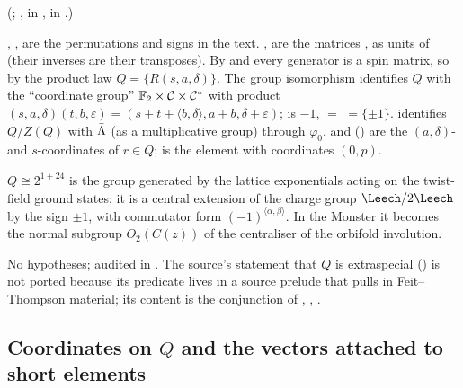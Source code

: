 (;
,  in ,  in .)
\begin{dictionary}
, ,  are the permutations and signs in the text.
,  are the matrices ,  as units of
 (their inverses are their transposes).  By  and
 every generator is a spin matrix, so by the product law
$Q=\{R(s,a,\delta)\}$.  The
group isomorphism  identifies $Q$ with the ``coordinate group''
$\mathbb{F}_2\times\mathcal{C}\times\mathcal{C}^*$ with product
$(s,a,\delta)(t,b,\varepsilon)=(s+t+\langle b,\delta\rangle,a+b,\delta+\varepsilon)$;  is
$-1$,  $=$  $=\{\pm1\}$.   identifies $Q/Z(Q)$ with
$\bar{\Lambda}$ (as a multiplicative group) through $\varphi_0$.   and
 () are the $(a,\delta)$- and $s$-coordinates of
$r\in Q$;  is the element with coordinates $(0,p)$.
\end{dictionary}
\begin{physics}
$Q\cong2^{1+24}$ is the group generated by the lattice exponentials acting on the twist-field ground
states: it is a central extension of the charge group $\Leech/2\Leech$ by the sign $\pm1$, with
commutator form $(-1)^{\langle\alpha,\beta\rangle}$.  In the Monster it becomes the normal subgroup
$O_2(C(z))$ of the centraliser of the orbifold involution.
\end{physics}
\begin{status}
No hypotheses; audited in .  The source's statement that $Q$ is extraspecial
() is not ported because its predicate lives in a source prelude that pulls
in Feit--Thompson material; its content is the conjunction of , ,
.
\end{status}

\subsection{Coordinates on \texorpdfstring{$Q$}{Q} and the vectors attached to short elements}

